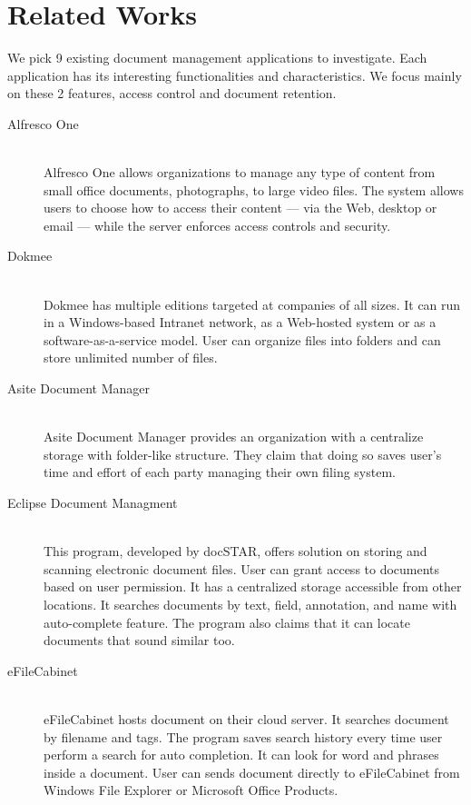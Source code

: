 \section{Related Works} \label{relate-works}
We pick 9 existing document management applications to investigate.
Each application has its interesting functionalities and characteristics.
We focus mainly on these 2 features, access control and document retention.
\begin{description}
\item[Alfresco One] \hfill \\
Alfresco One allows organizations to manage any type of content from small office documents, photographs, to large video files.
The system allows users to choose how to access their content --- via the Web, desktop or email --- while the server enforces access controls and security.

\item[Dokmee] \hfill \\
Dokmee has multiple editions targeted at companies of all sizes.
It can run in a Windows-based Intranet network, as a Web-hosted system or as a software-as-a-service model.
User can organize files into folders and can store unlimited number of files.

\item[Asite Document Manager] \hfill \\
Asite Document Manager provides an organization with a centralize storage with folder-like structure.
They claim that doing so saves user's time and effort of each party managing their own filing system.

\item[Eclipse Document Managment] \hfill \\
This program, developed by docSTAR, offers solution on storing and scanning electronic document files.
User can grant access to documents based on user permission.
It has a centralized storage accessible from other locations.
It searches documents by text, field, annotation, and name with auto-complete feature.
The program also claims that it can locate documents that sound similar too.

\item[eFileCabinet] \hfill \\
eFileCabinet hosts document on their cloud server.
It searches document by filename and tags.
The program saves search history every time user perform a search for auto completion.
It can look for word and phrases inside a document.
User can sends document directly to eFileCabinet from Windows File Explorer or Microsoft Office Products.


\end{description}
